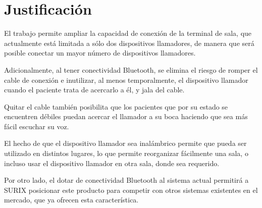 
\section{Justificación}

El trabajo permite ampliar la capacidad de conexión de la terminal de sala, que actualmente está limitada a sólo dos dispositivos llamadores, de manera que será posible conectar un mayor número de dispositivos llamadores.

Adicionalmente, al tener conectividad Bluetooth, se elimina el riesgo de romper el cable de conexión e inutilizar, al menos temporalmente, el dispositivo llamador cuando el paciente trata de acercarlo a él, y jala del cable.

Quitar el cable también posibilita que los pacientes que por su estado se encuentren débiles puedan acercar el llamador a su boca haciendo que sea más fácil escuchar su voz.

El hecho de que el dispositivo llamador sea inalámbrico permite que pueda ser utilizado en distintos lugares, lo que permite reorganizar fácilmente una sala, o incluso usar el dispositivo llamador en otra sala, donde sea requerido.

Por otro lado, el dotar de conectividad Bluetooth al sistema actual permitirá a SURIX posicionar este producto para competir con otros sistemas existentes en el mercado, que ya ofrecen esta característica.
